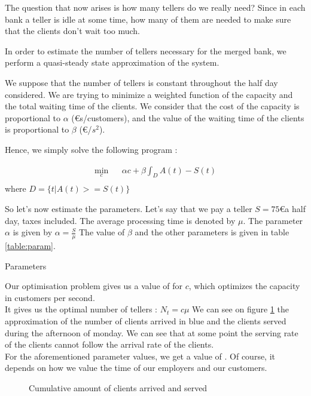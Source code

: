 \documentclass[12pt,a4paper,notitlepage]{report}
\begin{document}
The question that now arises is how many tellers do we really need? Since in each bank a teller is idle at some time, how many of them are needed to make sure that the clients don't wait too much.


In order to estimate the number of tellers necessary for the merged bank, we perform a quasi-steady state approximation of the system. 

We suppose that the number of tellers is constant throughout the half day considered.
We are trying to minimize a weighted function of the capacity and the total waiting time of the clients.
We consider that the cost of the capacity is proportional to $ \alpha$ (\euro s/customers), and the value of the waiting time of the clients is proportional to $\beta$ (\euro/$s^2$).

Hence, we simply solve the following program :

\begin{eqnarray*}
\min_c & & \alpha c + \beta \int_D A(t)-S(t)\\
\end{eqnarray*}
where $D = \{t | A(t)>=S(t) \}$

So let's now estimate the parameters. Let's say that we pay a teller $S = 75$\euro  a half day, taxes included.
The average processing time is denoted by $\mu$. 
The parameter $\alpha$ is given by $\alpha = \frac{S}{\mu}$
The value of $\beta$ and the other parameters is given in table \ref{table:param}.
\begin{table}

\caption{Parameters\label{table:param}}
\end{table}

Our optimisation problem gives us a value of  for $c$, which optimizes the capacity in customers per second.\\
It gives us the optimal number of tellers : $N_t = c \mu$
We can see on figure \ref{fig:clients_lun} the approximation of the number of clients arrived in blue and the clients served during the afternoon of monday. We can see that at some point the serving rate of the clients cannot follow the arrival rate of the clients. \\
For the aforementioned parameter values, we get a value of . Of course, it depends on how we value the time of our employers and our customers.
\begin{figure}[h]
\centering
{}
\caption{Cumulative amount of clients arrived and served\label{fig:clients_lun}}
\end{figure}
\end{document}
